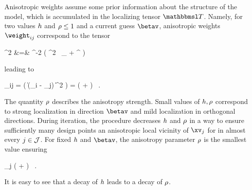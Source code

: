 Anisotropic weights assume some prior information about the structure of the model, which is accumulated 
in the localizing tensor \( \TEDR \).
Namely, for two values \( h \) and \( \rho \leq 1 \) and a current guess \( \betav \), anisotropic weights \( \weight_{ij} \)
correspond to the tensor 
\begin{EQA}[rcl]
	\TEDR^{2}
	&=&
	\hiso^{-2} \bigl( \aniso^{2} \, \Id_{\dimd} + \betav \betav^{\T} \bigr)
\label{iufhvu8kjbmnll475edf}
\end{EQA}
leading to 
\begin{EQA}[c]
	\weight_{ij}
	=
	\Kern\bigl( \| \TEDR (\Xv_{i} - \xv_{j}) \|^{2} \bigr)
	=
	\Kern\bigl( 
		+  
	\bigr)
	\, .
\end{EQA}
The quantity \( \rho \) describes the anisotropy strength.
Small values of \( h, \rho \) correspond to strong localization in direction \( \betav \)
and mild localization in orthogonal directions. 
During iteration, the procedure decreases \( h \) and \( \rho \) in a way 
to ensure sufficiently many design points an anisotropic local vicinity of \( \xv_{j} \) for in almost every \( j \in \mathcal{J} \).
For fixed \( h \) and \( \betav \), the anisotropy parameter \( \rho \) is the smallest value ensuring
\begin{EQA}[c]
	 \sum_{j \in \JJJ} \sumi \Kern\Bigl( 
		 +  
	\Bigr)
	\geq 
	\nmin
	\, .
\label{jhgiverkytde4w34etycja}
\end{EQA}
It is easy to see that a decay of \( h \) leads to a decay of \( \rho \).


